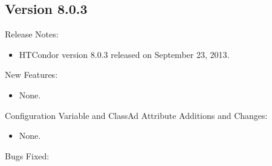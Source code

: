 \subsection*{\label{sec:New-8-0-3}Version 8.0.3}

\noindent Release Notes:

\begin{itemize}

\item HTCondor version 8.0.3 released on September 23, 2013.

\end{itemize}


\noindent New Features:

\begin{itemize}

\item None.

\end{itemize}

\noindent Configuration Variable and ClassAd Attribute Additions and Changes:

\begin{itemize}

\item None.

\end{itemize}

\noindent Bugs Fixed:

